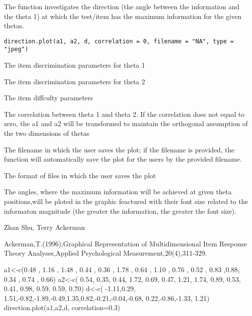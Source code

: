 \begin{Description}\relax
The function investigates the direction (the angle between the information and the theta 1) at which the test/item has the maximum information for the given thetas.
\end{Description}
\begin{Usage}
\begin{verbatim}
direction.plot(a1, a2, d, correlation = 0, filename = "NA", type = "jpeg")
\end{verbatim}
\end{Usage}
\begin{Arguments}
\begin{ldescription}
\item[\code{a1}] The item discrimination parameters for theta 1 
\item[\code{a2}] The item discrimination parameters for theta 2 
\item[\code{d}] The item diffculty parameters 
\item[\code{correlation}] The correlation between theta 1 and theta 2. If the correlation does not equal to zero, the a1 and a2 will be transformed to maintain the orthogonal assumption of the two dimensions of thetas 
\item[\code{filename}] The filename in which the user saves the plot; if the filename is provided, the function will automatically save the plot for the users by the provided filename. 
\item[\code{type}] The format of files in which the user saves the plot  
\end{ldescription}
\end{Arguments}
\begin{Details}\relax
The angles, where the maximum information will be achieved at given theta positions,will be ploted in the graphic feactured with their font size related to the informaton magnitude (the greater the information, the greater the font size).
\end{Details}
\begin{Author}\relax
Zhan Shu, Terry Ackerman
\end{Author}
\begin{References}\relax
Ackerman,T.(1996),Graphical Representation of Multidimensional Item Response Theory Analyses,Applied Psychological Measurement,20(4),311-329.
\end{References}
\begin{Examples}
\begin{ExampleCode}
a1<-c(0.48 , 1.16 , 1.48 , 0.44 , 0.36 , 1.78 , 0.64 , 1.10 , 0.76 , 0.52 , 0.83 ,0.88, 0.34 , 0.74 , 0.66)
a2<-c( 0.54, 0.35, 0.44, 1.72, 0.69, 0.47, 1.21, 1.74, 0.89, 0.53, 0.41, 0.98, 0.59, 0.59, 0.70)
d<-c( -1.11,0.29, 1.51,-0.82,-1.89,-0.49,1.35,0.82,-0.21,-0.04,-0.68, 0.22,-0.86,-1.33, 1.21)
direction.plot(a1,a2,d, correlation=0.3)
\end{ExampleCode}
\end{Examples}

